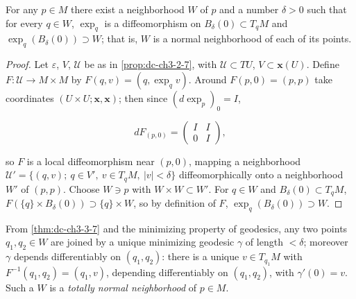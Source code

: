 \begin{theorem}
  \label{thm:dc-ch3-3-7}
  \leanok
  For any $p\in M$ there exist a neighborhood $W$ of $p$ and a number $\delta>0$
  such that for every $q\in W$, $\exp_q$ is a diffeomorphism on
  $B_\delta(0)\subset T_qM$ and $\exp_q(B_\delta(0))\supset W$; that is, $W$ is a
  normal neighborhood of each of its points.
\end{theorem}
\begin{proof}
  \sketch
  \leanok
  Let $\varepsilon$, $V$, $\mathcal{U}$ be as in \cref{prop:dc-ch3-2-7}, with
  $\mathcal{U}\subset TU$, $V\subset\mathbf{x}(U)$. Define $F:\mathcal{U}\to M\times M$
  by $F(q,v)=(q,\exp_q v)$. Around $F(p,0)=(p,p)$ take coordinates
  $(U\times U;\mathbf{x},\mathbf{x})$; then since $(d\exp_p)_0=I$,

  $$
  dF_{(p,0)}=\begin{pmatrix}I & I\\ 0 & I\end{pmatrix},
  $$

  so $F$ is a local diffeomorphism near $(p,0)$, mapping a neighborhood
  $\mathcal{U}'=\{(q,v);\ q\in V',\ v\in T_qM,\ |v|<\delta\}$ diffeomorphically onto
  a neighborhood $W'$ of $(p,p)$. Choose $W\ni p$ with $W\times W\subset W'$. For
  $q\in W$ and $B_\delta(0)\subset T_qM$, $F(\{q\}\times B_\delta(0))\supset\{q\}\times W$,
  so by definition of $F$, $\exp_q(B_\delta(0))\supset W$.
\end{proof}

\begin{remark}
  \label{rem:dc-ch3-3-8}
  From \cref{thm:dc-ch3-3-7} and the minimizing property of geodesics, any two points
  $q_1,q_2\in W$ are joined by a unique minimizing geodesic $\gamma$ of length
  $<\delta$; moreover $\gamma$ depends differentiably on $(q_1,q_2)$: there is a
  unique $v\in T_{q_1}M$ with $F^{-1}(q_1,q_2)=(q_1,v)$, depending differentiably on
  $(q_1,q_2)$, with $\gamma'(0)=v$. Such a $W$ is a \emph{totally normal neighborhood} of
  $p\in M$.
\end{remark}


